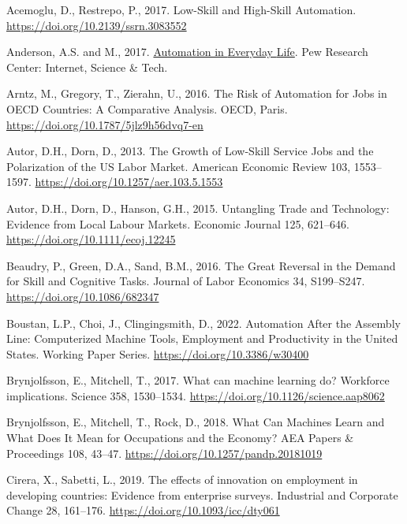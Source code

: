\documentclass[
  11,
  a4paperpaper,
]{article}
\newlength{\cslhangindent}
\newenvironment{CSLReferences}[2] %
 {\begin{list}{}{%
  \setlength{\itemindent}{0pt}
  \setlength{\leftmargin}{0pt}
  \setlength{\parsep}{0pt}
  \ifodd #1
   \setlength{\leftmargin}{\cslhangindent}
   \setlength{\itemindent}{-1\cslhangindent}
  \fi
  \setlength{\itemsep}{#2\baselineskip}}}
 {\end{list}}
\begin{document}
\begin{CSLReferences}{1}{0}
Acemoglu, D., Restrepo, P., 2017. Low-{Skill} and {High}-{Skill}
{Automation}. \url{https://doi.org/10.2139/ssrn.3083552}

Anderson, A.S. and M., 2017.
\href{https://www.pewresearch.org/internet/2017/10/04/automation-in-everyday-life/}{Automation
in {Everyday} {Life}}. Pew Research Center: Internet, Science \& Tech.

Arntz, M., Gregory, T., Zierahn, U., 2016. The {Risk} of {Automation}
for {Jobs} in {OECD} {Countries}: {A} {Comparative} {Analysis}. OECD,
Paris. \url{https://doi.org/10.1787/5jlz9h56dvq7-en}

Autor, D.H., Dorn, D., 2013. The {Growth} of {Low}-{Skill} {Service}
{Jobs} and the {Polarization} of the {US} {Labor} {Market}. American
Economic Review 103, 1553--1597.
\url{https://doi.org/10.1257/aer.103.5.1553}

Autor, D.H., Dorn, D., Hanson, G.H., 2015. Untangling {Trade} and
{Technology}: {Evidence} from {Local} {Labour} {Markets}. Economic
Journal 125, 621--646. \url{https://doi.org/10.1111/ecoj.12245}

Beaudry, P., Green, D.A., Sand, B.M., 2016. The {Great} {Reversal} in
the {Demand} for {Skill} and {Cognitive} {Tasks}. Journal of Labor
Economics 34, S199--S247. \url{https://doi.org/10.1086/682347}

Boustan, L.P., Choi, J., Clingingsmith, D., 2022. Automation {After} the
{Assembly} {Line}: {Computerized} {Machine} {Tools}, {Employment} and
{Productivity} in the {United} {States}. Working {Paper} {Series}.
\url{https://doi.org/10.3386/w30400}

Brynjolfsson, E., Mitchell, T., 2017. What can machine learning do?
{Workforce} implications. Science 358, 1530--1534.
\url{https://doi.org/10.1126/science.aap8062}

Brynjolfsson, E., Mitchell, T., Rock, D., 2018. What {Can} {Machines}
{Learn} and {What} {Does} {It} {Mean} for {Occupations} and the
{Economy}? AEA Papers \& Proceedings 108, 43--47.
\url{https://doi.org/10.1257/pandp.20181019}

Cirera, X., Sabetti, L., 2019. The effects of innovation on employment
in developing countries: Evidence from enterprise surveys. Industrial
and Corporate Change 28, 161--176.
\url{https://doi.org/10.1093/icc/dty061}


\end{CSLReferences}
\end{document}
